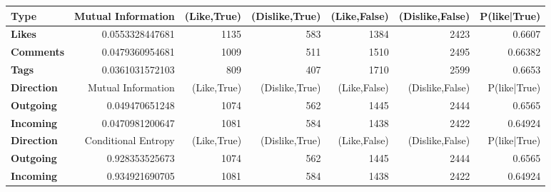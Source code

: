 \documentclass[letterpaper]{article}
\begin{document}
\begin{figure}
\begin{table}
\begin{tabular}{| >{\small}l | >{\small}r | >{\small}r | >{\small}r | >{\small}r | >{\small}r | >{\small}r |}
		\hline
		\hline
		\textbf{Type}  & Mutual Information & (Like,True) & (Dislike,True) & (Like,False) & (Dislike,False)  & P(like|True)\\
		\hline
		\textbf{Likes}  &  0.0553328447681 & 1135 & 583 & 1384 & 2423 & 0.6607\\
		\hline
		\textbf{Comments}  &  0.0479360954681 & 1009 & 511 & 1510 & 2495 & 0.66382\\
		\hline
		\textbf{Tags}  &  0.0361031572103 & 809 & 407 & 1710 & 2599 & 0.6653\\
		\hline
		\hline
		\textbf{Direction} & Mutual Information & (Like,True) & (Dislike,True) & (Like,False) & (Dislike,False)  & P(like|True)\\
		\hline
		\textbf{Outgoing}  &  0.049470651248 & 1074 & 562 & 1445 & 2444 &  0.6565\\
		\hline
		\textbf{Incoming}  &  0.0470981200647 & 1081 & 584 & 1438 & 2422 & 0.64924\\
		\hline
		\hline
		\textbf{Direction} & Conditional Entropy &  (Like,True) & (Dislike,True) & (Like,False) & (Dislike,False)  & P(like|True)\\
		\hline
		\textbf{Outgoing}  &  0.928353525673 & 1074 & 562 & 1445 & 2444 & 0.6565\\
		\hline
		\textbf{Incoming}  &  0.934921690705 & 1081 & 584 & 1438 & 2422 & 0.64924\\
		\hline
	\end{tabular}
\end{table}
		

\end{figure}
\end{document}

